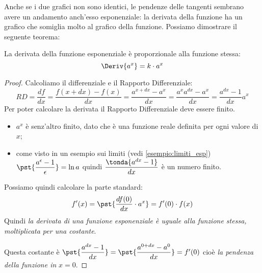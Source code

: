 Anche se i due grafici non sono identici, le pendenze delle tangenti 
sembrano avere un andamento anch'esso esponenziale: la derivata della 
funzione ha un grafico che somiglia molto al grafico della funzione. 
Possiamo dimostrare il seguente teorema:

\begin{teorema}
La derivata della funzione esponenziale è proporzionale alla funzione 
stessa:
\[\Deriv{a^x}=k \cdot a^x\]
\end{teorema}
\begin{proof}
Calcoliamo il differenziale e il Rapporto Differenziale: 
\[RD = \dfrac{df}{dx} = \dfrac{f(x + dx) - f(x)}{dx} = 
       \dfrac{a^{x+dx}-a^x}{dx} = 
       \dfrac{a^xa^{dx}-a^x}{dx} = 
       \dfrac{a^{dx}-1}{dx} a^x\]
Per poter calcolare la derivata il Rapporto Differenziale deve essere 
finito.
\begin{itemize}
\item 
\(a^x\) è senz'altro finito, dato che è una funzione reale definita per ogni 
valore di \(x\);
\item 
come visto in un esempio sui limiti (vedi \ref{esempio:limiti_esp})
\(\pst{\dfrac{a^\epsilon-1}{\epsilon}}=\ln{a}\) quindi 
\(\dfrac{\tonda{a^{dx}-1}}{dx}\) è un numero finito.
\end{itemize}
Possiamo quindi calcolare la parte standard:
\[f'(x)= \pst{\dfrac{df(0)}{dx}\cdot a^x}=f'(0) \cdot f(x)\]
Quindi \emph{la derivata di una funzione esponenziale è uguale alla
funzione stessa, moltiplicata per una costante}.

Questa costante è 
\(\pst{\dfrac{a^{dx}-1}{dx}} = \pst{\dfrac{a^{0+dx}-a^0}{dx}} = f'(0)\)
cioè \emph{la pendenza della funzione in} \(x=0\).
\end{proof}




